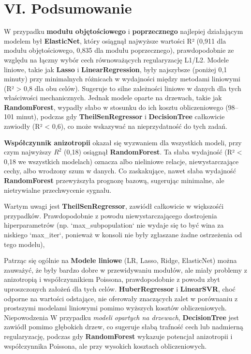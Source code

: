 {}
\justify
\fontsize{14}{16}\selectfont
\setlength{\parindent}{0pt}
\chapter*{VI. Podsumowanie} 
\fontsize{12}{14}\selectfont

\hspace{1.5cm} W przypadku \textbf{modułu objętościowego} i \textbf{poprzecznego} najlepiej działającym modelem był \textbf{ElasticNet}, który osiągnął najwyższe wartości R² (0,911 dla modułu objętościowego, 0,835 dla modułu poprzecznego), prawdopodobnie ze względu na łączny wybór cech równoważących regularyzację L1/L2. Modele liniowe, takie jak \textbf{Lasso} i \textbf{LinearRegression}, były najszybsze (poniżej 0,1 minuty) przy minimalnych różnicach w wydajności między metodami liniowymi (R² > 0,8 dla obu celów). Sugeruje to silne zależności liniowe w danych dla tych właściwości mechanicznych. Jednak modele oparte na drzewach, takie jak \textbf{RandomForest}, wypadły słabo w stosunku do ich kosztu obliczeniowego (98–101 minut), podczas gdy \textbf{TheilSenRegressor} i \textbf{DecisionTree} całkowicie zawiodły (R² < 0,6), co może wskazywać na nieprzydatność do tych zadań.

\hspace{1.5cm} \textbf{Współczynnik anizotropii} okazał się wyzwaniem dla wszystkich modeli, przy czym najwyższy $R^2$ (0,18) osiągnął \textbf{RandomForest}. Ta słaba wydajność (R² < 0,18 we wszystkich modelach) oznacza albo nieliniowe relacje, niewystarczające cechy, albo wrodzony szum w danych.  Co zaskakujące, nawet słaba wydajność \textbf{RandomForest} przewyższyła prognozę bazową, sugerując minimalne, ale nietrywialne przechwycenie sygnału.

\hspace{1.5cm} Wartym uwagi jest \textbf{TheilSenRegressor}, zawiódł całkowicie w większośći przypadków. Prawdopodobnie z powodu niewystarczającego dostrojenia hiperparametrów (np. `max\_subpopulation` nie wydaje się to być wina za niskiego `max\_iter`, ponieważ w konsoli nie były zgłaszane żadne ostrzeżenia od tego modelu),

\hspace{1.5cm} Patrząc się ogólnie na \textbf{Modele liniowe} (LR, Lasso, Ridge, ElasticNet) można zauważyć, że były bardzo dobre w przewidywaniu modułów, ale miały problemy z anizotropią i współczynnikiem Poissona, prawdopodobnie z powodu zbyt uproszczonych założeń dla tych celów. \textbf{HuberRegressor} i \textbf{LinearSVR}, choć odporne na wartości odstające, nie oferowały znaczących zalet w porównaniu z prostszymi modelami liniowymi pomimo wyższych kosztów obliczeniowych. Niepowodzenia  W przypadku \textit{modeli opartych na drzewach}, \textbf{DecisionTree} jest zawiódł pomimo głębokich drzew, co sugeruje słabą trafność cech lub nadmierną regularyzację, podczas gdy \textbf{RandomForest} wykazuje potencjał anizotropii i współczynnika Poissona, ale przy wysokich kosztach obliczeniowych.

